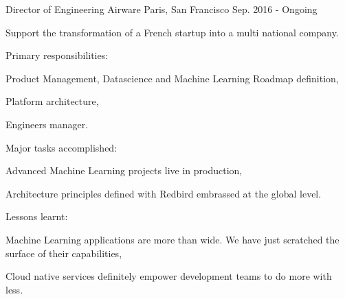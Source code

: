 

\begin{cventries}

  \cventry
    {Director of Engineering} %
    {Airware} %
    {Paris, San Francisco} %
    {Sep. 2016 - Ongoing} %
    {
      \begin{cvitems} %
        \item {Support the transformation of a French startup into a multi national company.}
        \item {Primary responsibilities:}
        \begin{cvsubitems}
          \item {Product Management, Datascience and Machine Learning Roadmap definition,}
          \item {Platform architecture,}
          \item {Engineers manager.}
        \end{cvsubitems}
        \item {Major tasks accomplished:}
        \begin{cvsubitems}
          \item {Advanced Machine Learning projects live in production,}
          \item {Architecture principles defined with Redbird embrassed at the global level.}
        \end{cvsubitems}
        \item {Lessons learnt:}
        \begin{cvsubitems}
          \item {Machine Learning applications are more than wide. We have just scratched the surface of their capabilities,}
          \item {Cloud native services definitely empower development teams to do more with less.}
        \end{cvsubitems}
      \end{cvitems}
    }


\end{cventries}
